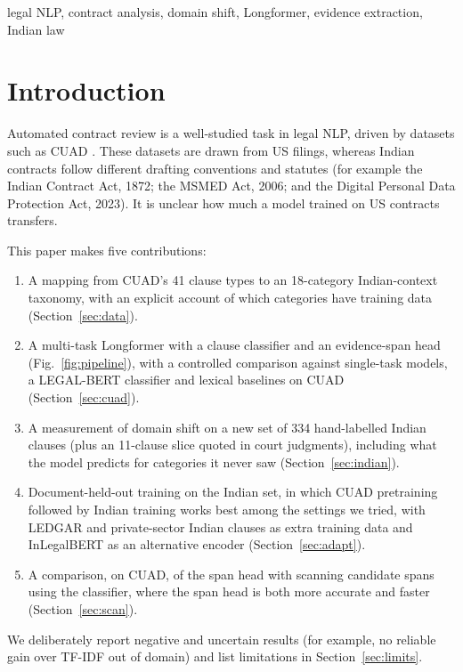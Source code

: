 \documentclass[conference]{IEEEtran}
\begin{document}
\begin{IEEEkeywords}
legal NLP, contract analysis, domain shift, Longformer, evidence extraction, Indian law
\end{IEEEkeywords}

\section{Introduction}
Automated contract review is a well-studied task in legal NLP, driven by datasets such as CUAD \cite{hendrycks2021cuad}. These datasets are drawn from US filings, whereas Indian contracts follow different drafting conventions and statutes (for example the Indian Contract Act, 1872; the MSMED Act, 2006; and the Digital Personal Data Protection Act, 2023). It is unclear how much a model trained on US contracts transfers.

This paper makes five contributions:
\begin{enumerate}
\item A mapping from CUAD's 41 clause types to an 18-category Indian-context taxonomy, with an explicit account of which categories have training data (Section~\ref{sec:data}).
\item A multi-task Longformer with a clause classifier and an evidence-span head (Fig.~\ref{fig:pipeline}), with a controlled comparison against single-task models, a LEGAL-BERT classifier and lexical baselines on CUAD (Section~\ref{sec:cuad}).
\item A measurement of domain shift on a new set of 334 hand-labelled Indian clauses (plus an 11-clause slice quoted in court judgments), including what the model predicts for categories it never saw (Section~\ref{sec:indian}).
\item Document-held-out training on the Indian set, in which CUAD pretraining followed by Indian training works best among the settings we tried, with LEDGAR and private-sector Indian clauses as extra training data and InLegalBERT as an alternative encoder (Section~\ref{sec:adapt}).
\item A comparison, on CUAD, of the span head with scanning candidate spans using the classifier, where the span head is both more accurate and faster (Section~\ref{sec:scan}).
\end{enumerate}
We deliberately report negative and uncertain results (for example, no reliable gain over TF-IDF out of domain) and list limitations in Section~\ref{sec:limits}.
\end{document}
